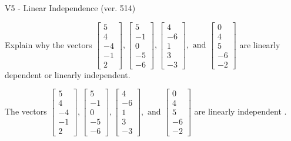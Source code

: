 \begin{exercise}
  \begin{exerciseTitle}V5 - Linear Independence (ver. 514)\end{exerciseTitle}
  \begin{exerciseStatement}
    Explain why the vectors \(\left[\begin{array}{r}
5 \\
4 \\
-4 \\
-1 \\
2
\end{array}\right] , \left[\begin{array}{r}
5 \\
-1 \\
0 \\
-5 \\
-6
\end{array}\right] , \left[\begin{array}{r}
4 \\
-6 \\
1 \\
3 \\
-3
\end{array}\right] , \text{ and } \left[\begin{array}{r}
0 \\
4 \\
5 \\
-6 \\
-2
\end{array}\right]\) are linearly dependent or linearly independent.	


  \end{exerciseStatement}
  \begin{exerciseAnswer}
   The vectors \(\left[\begin{array}{r}
5 \\
4 \\
-4 \\
-1 \\
2
\end{array}\right] , \left[\begin{array}{r}
5 \\
-1 \\
0 \\
-5 \\
-6
\end{array}\right] , \left[\begin{array}{r}
4 \\
-6 \\
1 \\
3 \\
-3
\end{array}\right] , \text{ and } \left[\begin{array}{r}
0 \\
4 \\
5 \\
-6 \\
-2
\end{array}\right]\) are 
  	 linearly independent  .
  


  \end{exerciseAnswer}
\end{exercise}